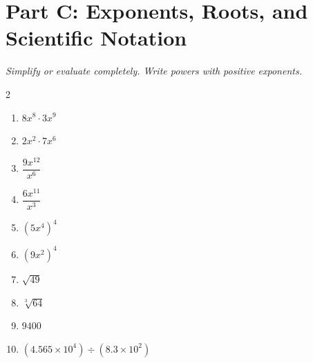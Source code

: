 \documentclass[11pt]{article}
\begin{document}
\section*{Part C: Exponents, Roots, and Scientific Notation}
\noindent\textit{Simplify or evaluate completely. Write powers with positive exponents.}
\begin{multicols}{2}
\begin{enumerate}
  \item $8x^{8} \cdot 3x^{9}$
  \vspace{1.2cm}
  \item $2x^{2} \cdot 7x^{6}$
  \vspace{1.2cm}
  \item $\dfrac{9x^{12}}{x^{6}}$
  \vspace{1.2cm}
  \item $\dfrac{6x^{11}}{x^{3}}$
  \vspace{1.2cm}
  \item $(5x^{4})^{4}$
  \vspace{1.2cm}
  \item $(9x^{2})^{4}$
  \vspace{1.2cm}
  \item $\sqrt{49}$
  \vspace{1.2cm}
  \item $\sqrt[3]{64}$
  \vspace{1.2cm}
  \item $9400$
  \vspace{1.2cm}
  \item $(4.565 \times 10^{4}) \div (8.3 \times 10^{2})$
  \vspace{1.2cm}
\end{enumerate}
\end{multicols}
\end{document}
